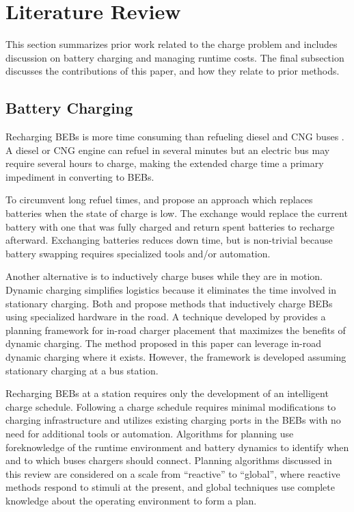 \section{Literature Review}
\par This section summarizes prior work related to the charge problem and includes discussion on battery charging and managing runtime costs. The final subsection discusses the contributions of this paper, and how they relate to prior methods.
\subsection{Battery Charging}
Recharging BEBs is more time consuming than refueling diesel and CNG buses \cite{wei_optimizing_2018}. A diesel or CNG engine can refuel in several minutes but an electric bus may require several hours to charge, making the extended charge time a primary impediment in converting to BEBs.
\par To circumvent long refuel times, \cite{xian_zhang_optimal_2016} and \cite{jain_battery_2020} propose an approach which replaces batteries when the state of charge is low. The exchange would replace the current battery with one that was fully charged and return spent batteries to recharge afterward. Exchanging batteries reduces down time, but is non-trivial because battery swapping requires specialized tools and/or automation.
\par Another alternative is to inductively charge buses while they are in motion. Dynamic charging simplifies logistics because it eliminates the time involved in stationary charging. Both \cite{balde_electric_2019} and \cite{jeong_automatic_2018} propose methods that inductively charge BEBs using specialized hardware in the road. A technique developed by \cite{csonka_optimization_2021} provides a planning framework for in-road charger placement that maximizes the benefits of dynamic charging.  The method proposed in this paper can leverage in-road dynamic charging where it exists.  However, the framework is developed assuming stationary charging at a bus station.
\par Recharging BEBs at a station %
requires only the development of an intelligent charge schedule. Following a charge schedule requires minimal modifications to charging infrastructure and utilizes existing charging ports in the BEBs with no need for additional tools or automation. Algorithms for planning use foreknowledge of the runtime environment and battery dynamics to identify when and to which buses chargers should connect. Planning algorithms discussed in this review are considered on a scale from ``reactive'' to ``global'', where reactive methods respond to stimuli at the present, and global techniques use complete knowledge about the operating environment to form a plan.
